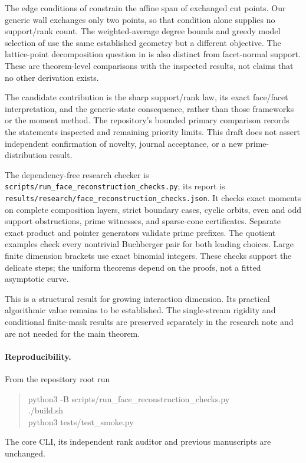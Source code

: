 \documentclass[11pt,a4paper]{article}
\theoremstyle{remark}\newtheorem{remark}[theorem]{Remark}
\begin{document}
The edge conditions of \cite[Section 5]{Mu03} constrain the affine
span of exchanged cut points. Our generic wall exchanges only
two points, so that condition alone supplies no support/rank
count. The weighted-average degree bounds and greedy model
selection of \cite[Theorems 2--7]{B08} use the same established
geometry but a different objective. The lattice-point
decomposition question in \cite[Theorem 4, Corollary 5 and
Section 4]{L21} is also distinct from facet-normal support.
These are theorem-level comparisons with the inspected results,
not claims that no other derivation exists.

The candidate contribution is the sharp support/rank law,
its exact face/facet interpretation, and the generic-state
consequence, rather than those frameworks or the moment method.
The repository's bounded primary comparison records the
statements inspected and remaining priority limits. This
draft does not assert independent confirmation of novelty,
journal acceptance, or a new prime-distribution result.

The dependency-free research checker is
\texttt{scripts/run\_face\_reconstruction\_checks.py};
its report is
\texttt{results/research/face\_reconstruction\_checks.json}.
It checks exact moments on complete composition layers,
strict boundary cases, cyclic orbits, even and odd support
obstructions, prime witnesses, and sparse-cone certificates.
Separate exact product and pointer generators validate prime
prefixes. The quotient examples check every nontrivial
Buchberger pair for both leading choices. Large finite
dimension brackets use exact binomial integers. These checks
support the delicate steps; the uniform theorems depend
on the proofs, not a fitted asymptotic curve.

This is a structural result for growing interaction dimension.
Its practical algorithmic value remains to be established.
The single-stream rigidity and conditional finite-mask results
are preserved separately in the research note and are not
needed for the main theorem.

\paragraph{Reproducibility.}
From the repository root run
\begin{quote}\ttfamily\small
python3 -B scripts/run\_face\_reconstruction\_checks.py\\
./build.sh\\
python3 tests/test\_smoke.py
\end{quote}
The core CLI, its independent rank auditor and previous
manuscripts are unchanged.
\end{document}
